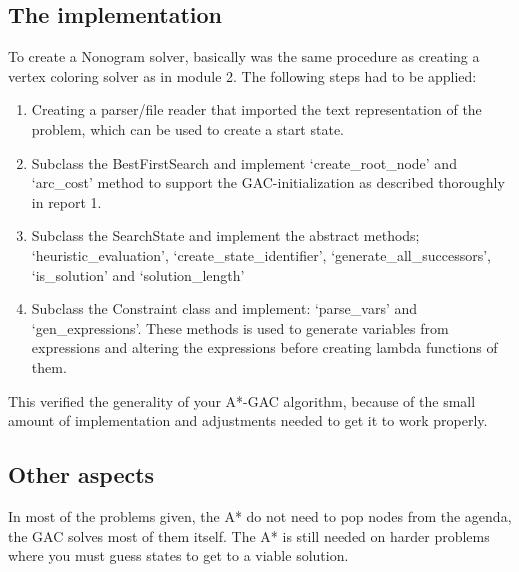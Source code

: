 \subsection{The implementation}
To create a Nonogram solver, basically was the same procedure as creating a vertex coloring solver as in module 2. The following steps had to be applied:
\begin{enumerate}
	\item{Creating a parser/file reader that imported the text representation of the problem, which can be used to create a start state.}
	\item{Subclass the BestFirstSearch and implement `create\_root\_node' and `arc\_cost' method to support the GAC-initialization as described thoroughly in report 1.}
	\item{Subclass the SearchState and implement the abstract methods; `heuristic\_evaluation', `create\_state\_identifier', `generate\_all\_successors', `is\_solution' and `solution\_length' }
	\item{Subclass the Constraint class and implement: `parse\_vars' and `gen\_expressions'. These methods is used to generate variables from expressions and altering the expressions before creating lambda functions of them.}
\end{enumerate}

This verified the generality of your A*-GAC algorithm, because of the small amount of implementation and adjustments needed to get it to work properly.

\subsection{Other aspects}
In most of the problems given, the A* do not need to pop nodes from the agenda, the GAC solves most of them itself. The A* is still needed on harder problems where you must guess states to get to a viable solution.

